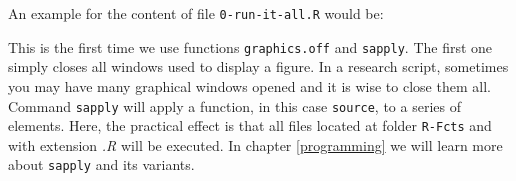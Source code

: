\documentclass[
  12pt,
]{book}
\newenvironment{Shaded}{\begin{snugshade}}{\end{snugshade}}
\newcommand{\AttributeTok}[1]{\textcolor[rgb]{0.61,0.61,0.61}{#1}}
\newcommand{\CommentTok}[1]{\textcolor[rgb]{0.37,0.37,0.37}{\textit{#1}}}
\newcommand{\ConstantTok}[1]{\textcolor[rgb]{0,0,0}{#1}}
\newcommand{\FunctionTok}[1]{\textcolor[rgb]{0,0,0}{#1}}
\newcommand{\NormalTok}[1]{#1}
\newcommand{\OtherTok}[1]{\textcolor[rgb]{0.37,0.37,0.37}{#1}}
\newcommand{\SpecialCharTok}[1]{\textcolor[rgb]{0,0,0}{#1}}
\newcommand{\StringTok}[1]{\textcolor[rgb]{0.5,0.5,0.5}{#1}}
\begin{document}
An example for the content of file \texttt{0-run-it-all.R} would be:

\begin{Shaded}
\end{Shaded}

This is the first time we use functions \texttt{graphics.off} and \texttt{sapply}. The first one simply closes all windows used to display a figure. In a research script, sometimes you may have many graphical windows opened and it is wise to close them all. Command \texttt{sapply} will apply a function, in this case \texttt{source}, to a series of elements. Here, the practical effect is that all files located at folder \texttt{R-Fcts} and with extension \emph{.R} will be executed. In chapter \ref{programming} we will learn more about \texttt{sapply} and its variants.
\end{document}
